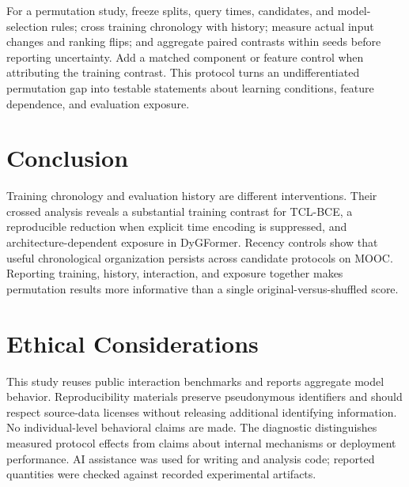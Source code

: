 \documentclass[sigconf,anonymous,review]{acmart}
\begin{document}
For a permutation study, freeze splits, query times, candidates, and model-selection rules; cross training chronology with history; measure actual input changes and ranking flips; and aggregate paired contrasts within seeds before reporting uncertainty. Add a matched component or feature control when attributing the training contrast. This protocol turns an undifferentiated permutation gap into testable statements about learning conditions, feature dependence, and evaluation exposure.

\section{Conclusion}
Training chronology and evaluation history are different interventions. Their crossed analysis reveals a substantial training contrast for TCL-BCE, a reproducible reduction when explicit time encoding is suppressed, and architecture-dependent exposure in DyGFormer. Recency controls show that useful chronological organization persists across candidate protocols on MOOC. Reporting training, history, interaction, and exposure together makes permutation results more informative than a single original-versus-shuffled score.
\label{sec:mainend}
\clearpage
\section*{Ethical Considerations}
This study reuses public interaction benchmarks and reports aggregate model behavior. Reproducibility materials preserve pseudonymous identifiers and should respect source-data licenses without releasing additional identifying information. No individual-level behavioral claims are made. The diagnostic distinguishes measured protocol effects from claims about internal mechanisms or deployment performance. AI assistance was used for writing and analysis code; reported quantities were checked against recorded experimental artifacts.
\balance


\end{document}

